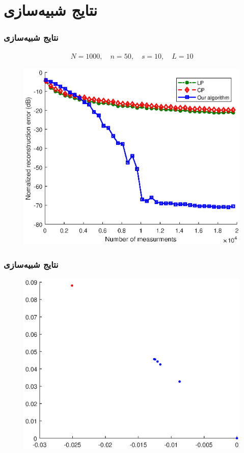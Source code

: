 \section{نتایج شبیه‌سازی\hfill}

\begin{frame}
\frametitle{نتایج شبیه‌سازی}
\begin{align*}
N= 1000, \quad n= 50, \quad s= 10, \quad L=10
\end{align*}
\begin{figure}
	\centering
	\includegraphics[scale=0.45]{Images/simfig1.eps}
\end{figure}
\end{frame}
\begin{frame}
\frametitle{نتایج شبیه‌سازی}
\begin{figure}
\centering
\includegraphics[scale=0.5]{Images/eer.eps}
\end{figure}
\end{frame}
